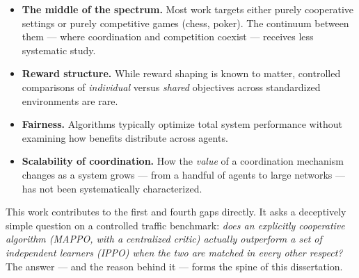 \begin{itemize}[leftmargin=1.4em]
  \item \textbf{The middle of the spectrum.} Most work targets either purely
  cooperative settings or purely competitive games (chess, poker). The continuum
  between them --- where coordination and competition coexist --- receives less
  systematic study.
  \item \textbf{Reward structure.} While reward shaping is known to matter,
  controlled comparisons of \emph{individual} versus \emph{shared} objectives
  across standardized environments are rare.
  \item \textbf{Fairness.} Algorithms typically optimize total system performance
  without examining how benefits distribute across agents.
  \item \textbf{Scalability of coordination.} How the \emph{value} of a
  coordination mechanism changes as a system grows --- from a handful of agents to
  large networks --- has not been systematically characterized.
\end{itemize}

This work contributes to the first and fourth gaps directly. It asks a deceptively
simple question on a controlled traffic benchmark: \emph{does an explicitly
cooperative algorithm (MAPPO, with a centralized critic) actually outperform a set
of independent learners (IPPO) when the two are matched in every other respect?}
The answer --- and the reason behind it --- forms the spine of this dissertation.
